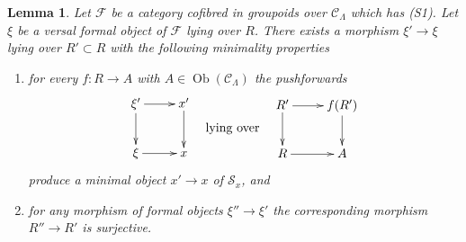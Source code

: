 \documentclass{stacks-project}
\theoremstyle{plain}
\newtheorem{lemma}[subsection]{Lemma}
\theoremstyle{definition}
\theoremstyle{remark}
\numberwithin{equation}{subsection}
\def\Ob{\mathop{\mathrm{Ob}}\nolimits}
\begin{document}
\begin{lemma}
\label{lemma-smallest-where-descends-versal}
Let $\mathcal{F}$ be a category cofibred in groupoids over
$\mathcal{C}_\Lambda$ which has (S1). Let $\xi$ be a versal formal object
of $\mathcal{F}$ lying over $R$. There exists a morphism $\xi' \to \xi$
lying over $R' \subset R$ with the following minimality properties
\begin{enumerate}
\item for every $f : R \to A$ with $A \in \Ob(\mathcal{C}_\Lambda)$
the pushforwards
$$
\vcenter{
\xymatrix{
\xi' \ar[d] \ar[r] & x' \ar[d] \\
\xi \ar[r] & x
}
}
\quad\text{lying over}\quad
\vcenter{
\xymatrix{
R' \ar[d] \ar[r] & f(R') \ar[d] \\
R \ar[r] & A
}
}
$$
produce a minimal object $x' \to x$ of $\mathcal{S}_x$, and
\item for any morphism of formal objects $\xi'' \to \xi'$
the corresponding morphism $R'' \to R'$ is surjective.
\end{enumerate}
\end{lemma}
\end{document}

